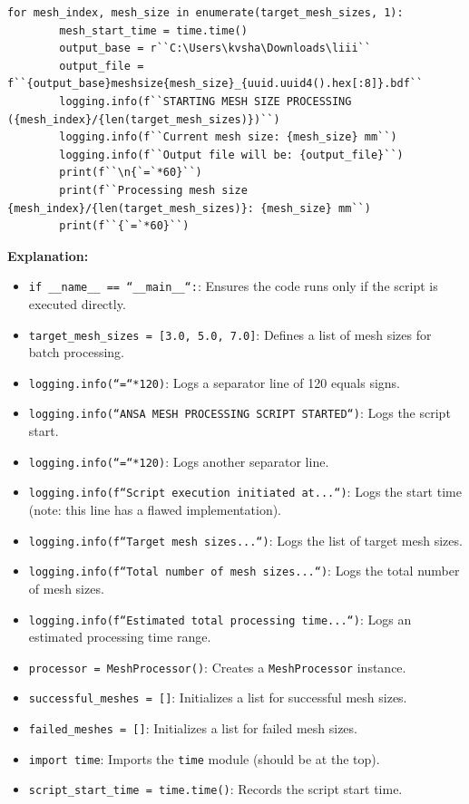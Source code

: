 \documentclass{book}
\begin{document}
\begin{itemize}[leftmargin=*,label=\textbullet]
\begin{lstlisting}[caption={Main Execution Block - Setup and Loop Start},label={lst:main_1}]
    for mesh_index, mesh_size in enumerate(target_mesh_sizes, 1):
        mesh_start_time = time.time()
        output_base = r``C:\Users\kvsha\Downloads\liii``
        output_file = f``{output_base}meshsize{mesh_size}_{uuid.uuid4().hex[:8]}.bdf``
        logging.info(f``STARTING MESH SIZE PROCESSING ({mesh_index}/{len(target_mesh_sizes)})``)
        logging.info(f``Current mesh size: {mesh_size} mm``)
        logging.info(f``Output file will be: {output_file}``)
        print(f``\n{`=`*60}``)
        print(f``Processing mesh size {mesh_index}/{len(target_mesh_sizes)}: {mesh_size} mm``)
        print(f``{`=`*60}``)
\end{lstlisting}
\textbf{Explanation:}
\begin{itemize}
    \item \texttt{if \_\_name\_\_ == ``\_\_main\_\_``:}: Ensures the code runs only if the script is executed directly.
    \item \texttt{target\_mesh\_sizes = [3.0, 5.0, 7.0]}: Defines a list of mesh sizes for batch processing.
    \item \texttt{logging.info(``=``*120)}: Logs a separator line of 120 equals signs.
    \item \texttt{logging.info(``ANSA MESH PROCESSING SCRIPT STARTED``)}: Logs the script start.
    \item \texttt{logging.info(``=``*120)}: Logs another separator line.
    \item \texttt{logging.info(f``Script execution initiated at...``)}: Logs the start time (note: this line has a flawed implementation).
    \item \texttt{logging.info(f``Target mesh sizes...``)}: Logs the list of target mesh sizes.
    \item \texttt{logging.info(f``Total number of mesh sizes...``)}: Logs the total number of mesh sizes.
    \item \texttt{logging.info(f``Estimated total processing time...``)}: Logs an estimated processing time range.
    \item \texttt{processor = MeshProcessor()}: Creates a \texttt{MeshProcessor} instance.
    \item \texttt{successful\_meshes = []}: Initializes a list for successful mesh sizes.
    \item \texttt{failed\_meshes = []}: Initializes a list for failed mesh sizes.
    \item \texttt{import time}: Imports the \texttt{time} module (should be at the top).
    \item \texttt{script\_start\_time = time.time()}: Records the script start time.

\end{itemize}
\end{itemize}
\end{document}
